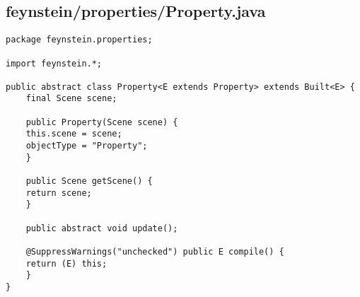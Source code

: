 \subsection*{feynstein/properties/Property.java}
\begin{lstlisting}
package feynstein.properties;

import feynstein.*;

public abstract class Property<E extends Property> extends Built<E> {
    final Scene scene;
	
    public Property(Scene scene) {
	this.scene = scene;
	objectType = "Property";
    }
	
    public Scene getScene() {
	return scene;
    }
	
    public abstract void update();
	
    @SuppressWarnings("unchecked") public E compile() {
	return (E) this;
    }
}\end{lstlisting}

